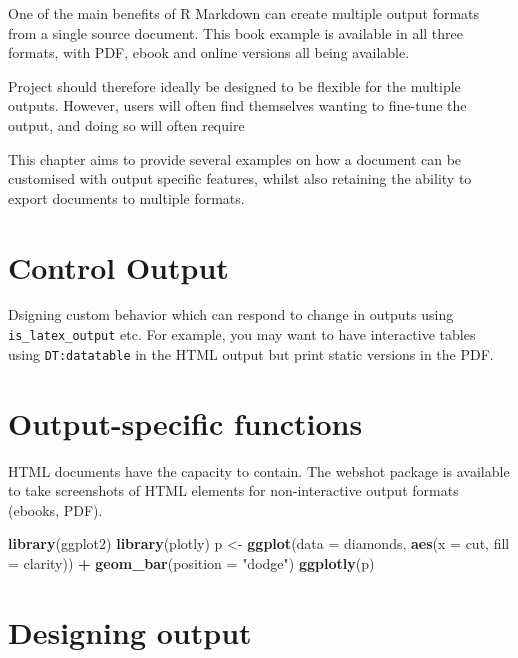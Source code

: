 \documentclass[]{book}
\newenvironment{Shaded}{\begin{snugshade}}{\end{snugshade}}
\newcommand{\KeywordTok}[1]{\textcolor[rgb]{0.13,0.29,0.53}{\textbf{#1}}}
\newcommand{\DataTypeTok}[1]{\textcolor[rgb]{0.13,0.29,0.53}{#1}}
\newcommand{\StringTok}[1]{\textcolor[rgb]{0.31,0.60,0.02}{#1}}
\newcommand{\OperatorTok}[1]{\textcolor[rgb]{0.81,0.36,0.00}{\textbf{#1}}}
\newcommand{\NormalTok}[1]{#1}
\begin{document}
One of the main benefits of R Markdown can create multiple output
formats from a single source document. This book example is available in
all three formats, with PDF, ebook and online versions all being
available.

Project should therefore ideally be designed to be flexible for the
multiple outputs. However, users will often find themselves wanting to
fine-tune the output, and doing so will often require

This chapter aims to provide several examples on how a document can be
customised with output specific features, whilst also retaining the
ability to export documents to multiple formats.

\section{Control Output}\label{control-output}

Dsigning custom behavior which can respond to change in outputs using
\texttt{is\_latex\_output} etc. For example, you may want to have
interactive tables using \texttt{DT:datatable} in the HTML output but
print static versions in the PDF.

\section{Output-specific functions}\label{output-specific-functions}

HTML documents have the capacity to contain. The webshot package is
available to take screenshots of HTML elements for non-interactive
output formats (ebooks, PDF).

\begin{Shaded}
\begin{Highlighting}[]
\KeywordTok{library}\NormalTok{(ggplot2)}
\KeywordTok{library}\NormalTok{(plotly)}
\NormalTok{p <-}\StringTok{ }\KeywordTok{ggplot}\NormalTok{(}\DataTypeTok{data =}\NormalTok{ diamonds, }\KeywordTok{aes}\NormalTok{(}\DataTypeTok{x =}\NormalTok{ cut, }\DataTypeTok{fill =}\NormalTok{ clarity)) }\OperatorTok{+}
\StringTok{            }\KeywordTok{geom_bar}\NormalTok{(}\DataTypeTok{position =} \StringTok{"dodge"}\NormalTok{)}
\KeywordTok{ggplotly}\NormalTok{(p)}
\end{Highlighting}
\end{Shaded}

\section{Designing output}\label{designing-output}
\end{document}
